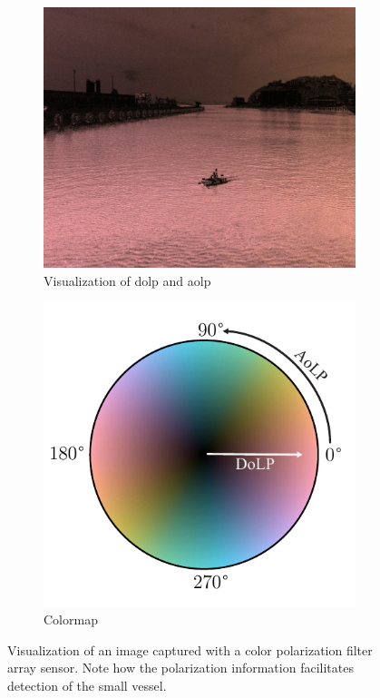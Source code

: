 \begin{figure}[H]
    \begin{subfigure}[B]{.49\textwidth}
        \includegraphics[width=\textwidth]{figures/img_0080_right_pol.jpg}
        \caption{Visualization of \gls{dolp} and \gls{aolp}}
    \end{subfigure}
    \hfill
    \begin{subfigure}[B]{.49\textwidth}
        \centering
        \includegraphics[width=.8\textwidth]{figures/cmap/aolp_dolp_cmap.pdf}
        \vspace{1em}
        \caption{Colormap}
    \end{subfigure}
    \caption{Visualization of an image captured with a color polarization filter array sensor. Note how the polarization information facilitates detection of the small vessel.}
\end{figure}

